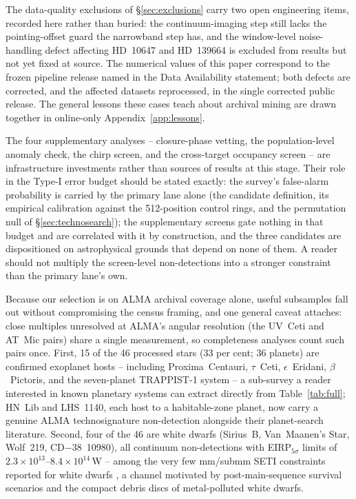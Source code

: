 \documentclass{openjournal}
\begin{document}
The data-quality exclusions of \S\ref{sec:exclusions} carry two
open engineering items, recorded here rather than buried: the
continuum-imaging step still lacks the pointing-offset guard the
narrowband step has, and the window-level noise-handling defect
affecting HD~10647 and HD~139664 is excluded from results but not
yet fixed at source. The numerical values of this paper correspond
to the frozen pipeline release named in the Data Availability
statement; both defects are corrected, and the affected datasets
reprocessed, in the single corrected public release. The general
lessons these cases teach about archival mining are drawn together
in online-only Appendix~\ref{app:lessons}.

The four supplementary analyses -- closure-phase vetting, the
population-level anomaly check, the chirp screen, and the
cross-target occupancy screen -- are infrastructure investments
rather than sources of results at this stage. Their role in the
Type-I error budget should be stated exactly: the survey's
false-alarm probability is carried by the primary lane alone (the
candidate definition, its empirical calibration against the
512-position control rings, and the permutation null of
\S\ref{sec:technosearch}); the supplementary screens gate nothing in
that budget and are correlated with it by construction, and the three
candidates are dispositioned on astrophysical grounds that depend on
none of them. A reader should not multiply the screen-level
non-detections into a stronger constraint than the primary lane's
own.

Because our selection is on ALMA archival coverage alone, useful
subsamples fall out without compromising the census framing, and one
general caveat attaches: close multiples unresolved at ALMA's
angular resolution (the UV~Ceti and AT~Mic pairs) share a single
measurement, so completeness analyses count such pairs once. First,
15 of the 46 processed stars (33 per cent; 36 planets) are confirmed
exoplanet hosts -- including Proxima~Centauri, $\tau$~Ceti,
$\epsilon$~Eridani, $\beta$~Pictoris, and the seven-planet TRAPPIST-1
system -- a sub-survey a reader interested in known planetary
systems can extract directly from Table~\ref{tab:full}; HN~Lib and
LHS~1140, each host to a habitable-zone planet, now carry a genuine
ALMA technosignature non-detection alongside their planet-search
literature. Second, four of the 46 are white dwarfs (Sirius~B,
Van~Maanen's Star, Wolf~219, CD$-$38~10980), all continuum
non-detections with EIRP$_{5\sigma}$ limits of
$2.3\times10^{13}$--$8.4\times10^{14}$\,W -- among the very few
mm/submm SETI constraints reported for white dwarfs
\citep{PollutedWD2026}, a channel motivated by post-main-sequence
survival scenarios and the compact debris discs of metal-polluted
white dwarfs.
\end{document}
